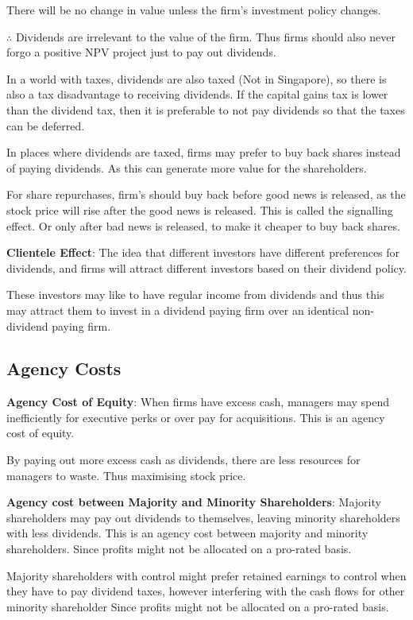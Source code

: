 There will be no change in value unless the firm's investment policy changes.

$\therefore$ Dividends are irrelevant to the value of the firm.
Thus firms should also never forgo a positive NPV project just to pay out dividends.

In a world with taxes, dividends are also taxed (Not in Singapore), so there is also a tax disadvantage to receiving dividends. If the capital gains tax is lower than the dividend tax, then it is preferable to not pay dividends so that the taxes can be deferred.

In places where dividends are taxed, firms may prefer to buy back shares instead of paying dividends. As this can generate more value for the shareholders.

For share repurchases, firm's should buy back before good news is released, as the stock price will rise after the good news is released. This is called the signalling effect. Or only after bad news is released, to make it cheaper to buy back shares.

\textbf{Clientele Effect}:
The idea that different investors have different preferences for dividends, and firms will attract different investors based on their dividend policy.

These investors may like to have regular income from dividends and thus this may attract them to invest in a dividend paying firm over an identical non-dividend paying firm.

\subsection{Agency Costs}
\textbf{Agency Cost of Equity}:
When firms have excess cash, managers may spend inefficiently for executive perks or over pay for acquisitions. This is an agency cost of equity.

By paying out more excess cash as dividends, there are less resources for managers to waste. Thus maximising stock price.

\textbf{Agency cost between Majority and Minority Shareholders}:
Majority shareholders may pay out dividends to themselves, leaving minority shareholders with less dividends. This is an agency cost between majority and minority shareholders. Since profits might not be allocated on a pro-rated basis.

Majority shareholders with control might prefer retained earnings to control when they have to pay dividend taxes, however interfering with the cash flows for other minority shareholder Since profits might not be allocated on a pro-rated basis.

